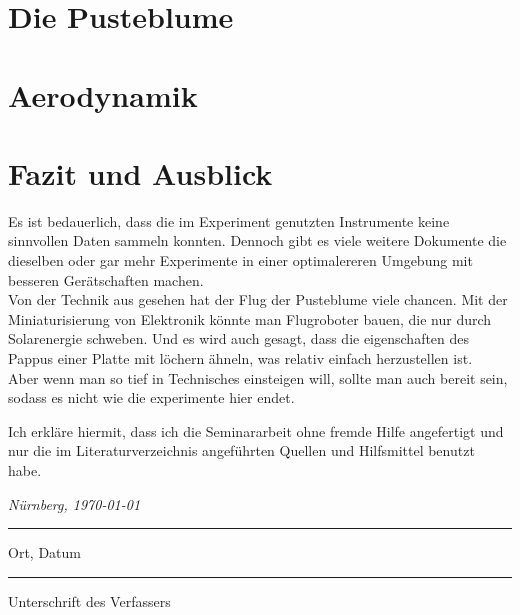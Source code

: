 \documentclass[a4paper, 12pt, final]{article} %
\begin{document}
    \section{Die Pusteblume}\label{sec:untersuchung-der-pusteblume}%
    


    \section{Aerodynamik}\label{sec:aerodynamik}%
    


    \section{Fazit und Ausblick}\label{sec:anwendung}

    Es ist bedauerlich, dass die im Experiment genutzten Instrumente keine sinnvollen Daten sammeln konnten.
    Dennoch gibt es viele weitere Dokumente die dieselben oder gar mehr Experimente in einer optimalereren Umgebung mit besseren Gerätschaften machen.\\
    Von der Technik aus gesehen hat der Flug der Pusteblume viele chancen.
    Mit der Miniaturisierung von Elektronik könnte man Flugroboter bauen, die nur durch Solarenergie schweben.
    Und es wird auch gesagt, dass die eigenschaften des Pappus einer Platte mit löchern ähneln,
    was relativ einfach herzustellen ist.\\
    Aber wenn man so tief in Technisches einsteigen will, sollte man auch bereit sein, sodass es nicht wie die experimente hier endet.


    \newpage%
    \printbibliography

    \newpage%
    \noindent\Large
    Ich erkläre hiermit, dass ich die Seminararbeit ohne fremde Hilfe angefertigt und nur die im Literaturverzeichnis angeführten Quellen und Hilfsmittel benutzt habe.

    \large
    \vspace{\fill}
    \noindent
    \begin{minipage}[b]{0.42\textwidth}
        \centering
        \textit{Nürnberg, \today}
        \vspace{4mm}
        \hrule
        \vspace{2mm}\par\noindent
        Ort, Datum
    \end{minipage}
    \hfill
    \begin{minipage}[b]{0.42\textwidth}
        \centering
        \hrule
        \vspace{2mm}\par\noindent
        Unterschrift des Verfassers
    \end{minipage}
\end{document}
